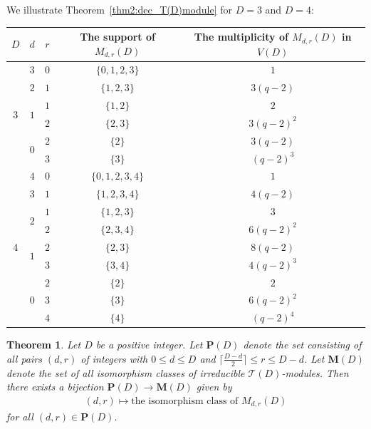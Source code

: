 \documentclass[pdftex]{sigma}%
\def\T{\mathcal T}
\numberwithin{equation}{section}
\newtheorem{Theorem}{Theorem}[section]
\begin{document}
We illustrate Theorem~\ref{thm2:dec_T(D)module} for $D=3$ and $D=4$:
\begin{table}[h!]
\centering
\extrarowheight=3pt
\begin{tabular}{c|c|c|c|c}
\toprule
$D$ &$d$ &$r$ &The support of $M_{d,r}(D)$ &The multiplicity of $M_{d,r}(D)$ in $V(D)$
\\
\midrule
\multirow{6}{*}{$3$} &$3$ &$0$ &$\{0,1,2,3\}$ &$1$
\\
\cline{2-5}
 &$2$ &$1$ &$\{1,2,3\}$ &$3(q-2)$
\\
\cline{2-5}
 &\multirow{2}{*}{$1$} &$1$ &$\{1,2\}$ &$2$
\\
\cline{3-5}
 & &$2$ &$\{2,3\}$ &$3(q-2)^2$
\\
\cline{2-5}
 &\multirow{2}{*}{$0$} &$2$ &$\{2\}$ &$3(q-2)$
 \\
\cline{3-5}
 & &$3$ &$\{3\}$ &$(q-2)^3$
 \\
 \midrule
%
\multirow{9}{*}{$4$} &$4$ &$0$ &$\{0,1,2,3,4\}$ &$1$
\\
\cline{2-5}
 &$3$ &$1$ &$\{1,2,3,4\}$ &$4(q-2)$
\\
\cline{2-5}
 &\multirow{2}{*}{$2$} &$1$ &$\{1,2,3\}$ &$3$
\\
\cline{3-5}
 & &$2$ &$\{2,3,4\}$ &$6(q-2)^2$
\\
\cline{2-5}
 &\multirow{2}{*}{$1$} &$2$ &$\{2,3\}$ &$8(q-2)$
 \\
\cline{3-5}
 & &$3$ &$\{3,4\}$ &$4(q-2)^3$
 \\
 \cline{2-5}
 &\multirow{3}{*}{$0$} &$2$ &$\{2\}$ &$2$
 \\
 \cline{3-5}
 & &$3$ &$\{3\}$ &$6(q-2)^2$
 \\
 \cline{3-5}
 & &$4$ &$\{4\}$ &$(q-2)^4$
 \\
 \bottomrule
\end{tabular}
\end{table}

\begin{Theorem}\label{thm2:T(D)irrmodule}
Let $D$ be a positive integer. Let $\mathbf P(D)$ denote the set consisting of all pairs $(d,r)$ of integers with $0\leq d\leq D$ and $\big\lceil \frac{D-d}{2}\big\rceil\leq r\leq D-d$. Let $\mathbf M(D)$ denote the set of all isomorphism classes of irreducible $\T(D)$-modules. Then there exists a bijection $\mathbf P(D)\to \mathbf M(D)$ given by
\begin{gather*}
(d,r) \mapsto \text{the isomorphism class of $M_{d,r}(D)$}
\end{gather*}
for all $(d,r)\in \mathbf P(D)$.
\end{Theorem}
\end{document}
